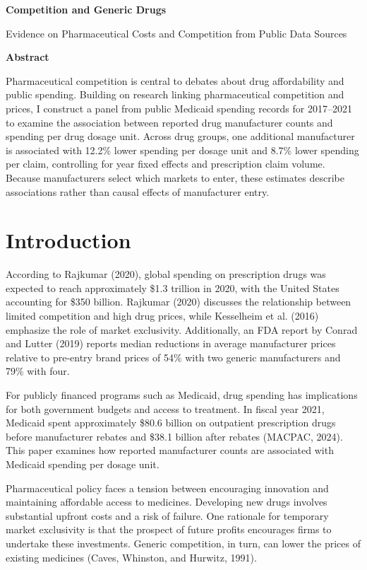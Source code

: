 \documentclass[12pt]{article}
\begin{document}
\begin{center}
    \Large
    \textbf{Competition and Generic Drugs}
        
    \vspace{0.4cm}
    \large
    Evidence on Pharmaceutical Costs and Competition from Public Data Sources
        
       
    \vspace{0.9cm}
    \textbf{Abstract}
    
\end{center}

Pharmaceutical competition is central to debates about drug affordability and public spending. Building on research linking pharmaceutical competition and prices, I construct a panel from public Medicaid spending records for 2017--2021 to examine the association between reported drug manufacturer counts and spending per drug dosage unit. Across drug groups, one additional manufacturer is associated with 12.2\% lower spending per dosage unit and 8.7\% lower spending per claim, controlling for year fixed effects and prescription claim volume. Because manufacturers select which markets to enter, these estimates describe associations rather than causal effects of manufacturer entry.

\section{Introduction}
According to Rajkumar (2020), global spending on prescription drugs was expected to reach approximately \$1.3 trillion in 2020, with the United States accounting for \$350 billion. Rajkumar (2020) discusses the relationship between limited competition and high drug prices, while Kesselheim et al. (2016) emphasize the role of market exclusivity. Additionally, an FDA report by Conrad and Lutter (2019) reports median reductions in average manufacturer prices relative to pre-entry brand prices of 54\% with two generic manufacturers and 79\% with four.

For publicly financed programs such as Medicaid, drug spending has implications for both government budgets and access to treatment. In fiscal year 2021, Medicaid spent approximately \$80.6 billion on outpatient prescription drugs before manufacturer rebates and \$38.1 billion after rebates (MACPAC, 2024). This paper examines how reported manufacturer counts are associated with Medicaid spending per dosage unit.

Pharmaceutical policy faces a tension between encouraging innovation and maintaining affordable access to medicines. Developing new drugs involves substantial upfront costs and a risk of failure. One rationale for temporary market exclusivity is that the prospect of future profits encourages firms to undertake these investments. Generic competition, in turn, can lower the prices of existing medicines (Caves, Whinston, and Hurwitz, 1991).
\end{document}
